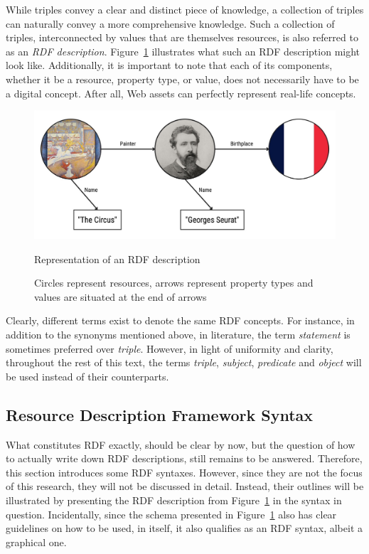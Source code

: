 While triples convey a clear and distinct piece of knowledge, a collection of triples can naturally convey a more comprehensive knowledge. Such a collection of triples, interconnected by values that are themselves resources, is also referred to as an \textit{RDF description}. Figure~\ref{fig:rdf_description} illustrates what such an RDF description might look like. Additionally, it is important to note that each of its components, whether it be a resource, property type, or value, does not necessarily have to be a digital concept. After all, Web assets can perfectly represent real-life concepts. \citep{miller1998introduction} \citep{candan2001resource}

\begin{figure}[htbp]
    \centering
	\includegraphics[width=\textwidth]{images/rdf_description.jpg}
	\caption{Representation of an RDF description}
    \caption*{Circles represent resources, arrows represent property types and values are situated at the end of arrows}
	\label{fig:rdf_description}
\end{figure}

Clearly, different terms exist to denote the same RDF concepts. For instance, in addition to the synonyms mentioned above, in literature, the term \textit{statement} is sometimes preferred over \textit{triple}. However, in light of uniformity and clarity, throughout the rest of this text, the terms \textit{triple}, \textit{subject}, \textit{predicate} and \textit{object} will be used instead of their counterparts. \citep{candan2001resource}

\subsection{Resource Description Framework Syntax}
\label{subsec:rdf_syntax}

What constitutes RDF exactly, should be clear by now, but the question of how to actually write down RDF descriptions, still remains to be answered. Therefore, this section introduces some RDF syntaxes. However, since they are not the focus of this research, they will not be discussed in detail. Instead, their outlines will be illustrated by presenting the RDF description from Figure~\ref{fig:rdf_description} in the syntax in question. Incidentally, since the schema presented in Figure~\ref{fig:rdf_description} also has clear guidelines on how to be used, in itself, it also qualifies as an RDF syntax, albeit a graphical one. \citep{miller1998introduction}

